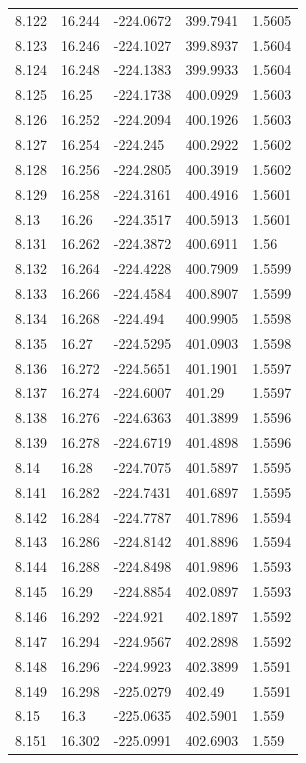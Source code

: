 \begin{tabular}{lllll}
8.122 & 16.244 & -224.0672 & 399.7941 & 1.5605 \\
8.123 & 16.246 & -224.1027 & 399.8937 & 1.5604 \\
8.124 & 16.248 & -224.1383 & 399.9933 & 1.5604 \\
8.125 & 16.25 & -224.1738 & 400.0929 & 1.5603 \\
8.126 & 16.252 & -224.2094 & 400.1926 & 1.5603 \\
8.127 & 16.254 & -224.245 & 400.2922 & 1.5602 \\
8.128 & 16.256 & -224.2805 & 400.3919 & 1.5602 \\
8.129 & 16.258 & -224.3161 & 400.4916 & 1.5601 \\
8.13 & 16.26 & -224.3517 & 400.5913 & 1.5601 \\
8.131 & 16.262 & -224.3872 & 400.6911 & 1.56 \\
8.132 & 16.264 & -224.4228 & 400.7909 & 1.5599 \\
8.133 & 16.266 & -224.4584 & 400.8907 & 1.5599 \\
8.134 & 16.268 & -224.494 & 400.9905 & 1.5598 \\
8.135 & 16.27 & -224.5295 & 401.0903 & 1.5598 \\
8.136 & 16.272 & -224.5651 & 401.1901 & 1.5597 \\
8.137 & 16.274 & -224.6007 & 401.29 & 1.5597 \\
8.138 & 16.276 & -224.6363 & 401.3899 & 1.5596 \\
8.139 & 16.278 & -224.6719 & 401.4898 & 1.5596 \\
8.14 & 16.28 & -224.7075 & 401.5897 & 1.5595 \\
8.141 & 16.282 & -224.7431 & 401.6897 & 1.5595 \\
8.142 & 16.284 & -224.7787 & 401.7896 & 1.5594 \\
8.143 & 16.286 & -224.8142 & 401.8896 & 1.5594 \\
8.144 & 16.288 & -224.8498 & 401.9896 & 1.5593 \\
8.145 & 16.29 & -224.8854 & 402.0897 & 1.5593 \\
8.146 & 16.292 & -224.921 & 402.1897 & 1.5592 \\
8.147 & 16.294 & -224.9567 & 402.2898 & 1.5592 \\
8.148 & 16.296 & -224.9923 & 402.3899 & 1.5591 \\
8.149 & 16.298 & -225.0279 & 402.49 & 1.5591 \\
8.15 & 16.3 & -225.0635 & 402.5901 & 1.559 \\
8.151 & 16.302 & -225.0991 & 402.6903 & 1.559 \\

\end{tabular}
